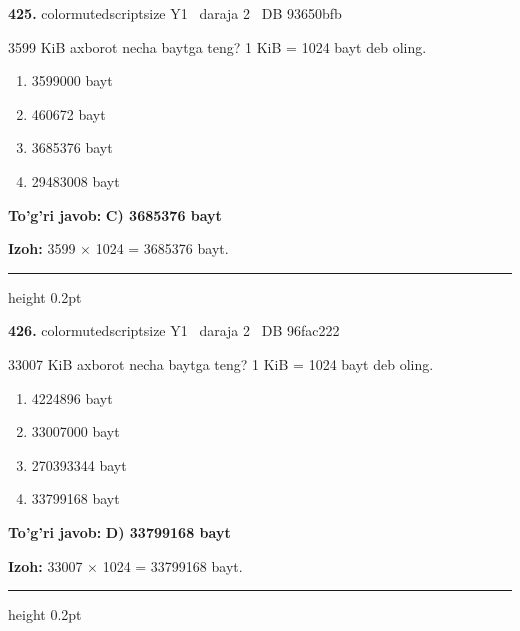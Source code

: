 \documentclass[10pt,a4paper,oneside]{article}
\begin{document}
\noindent\textbf{\color{ink}425.}  {color{muted}scriptsize Y1 \textbullet\ daraja 2 \textbullet\ DB 93650bfb}
\par
3599 KiB axborot necha baytga teng? 1 KiB = 1024 bayt deb oling.
\begin{enumerate}[label=\Alph*),leftmargin=9mm]
\item 3599000 bayt
\item 460672 bayt
\item 3685376 bayt
\item 29483008 bayt
\end{enumerate}
\begin{tcolorbox}[enhanced,breakable,colback=teal!4,colframe=teal!50!black,boxrule=0.5pt,arc=1.1mm,left=3mm,right=3mm,top=1.7mm,bottom=1.7mm,before skip=2mm,after skip=2mm]
\textbf{\color{teal}To'g'ri javob:} \textbf{C) 3685376 bayt}
\par\smallskip
\textbf{Izoh:} 3599 \ensuremath{\times} 1024 = 3685376 bayt.
\end{tcolorbox}
\vspace{2mm}\hrule height 0.2pt \vspace{3mm}

\noindent\textbf{\color{ink}426.}  {color{muted}scriptsize Y1 \textbullet\ daraja 2 \textbullet\ DB 96fac222}
\par
33007 KiB axborot necha baytga teng? 1 KiB = 1024 bayt deb oling.
\begin{enumerate}[label=\Alph*),leftmargin=9mm]
\item 4224896 bayt
\item 33007000 bayt
\item 270393344 bayt
\item 33799168 bayt
\end{enumerate}
\begin{tcolorbox}[enhanced,breakable,colback=teal!4,colframe=teal!50!black,boxrule=0.5pt,arc=1.1mm,left=3mm,right=3mm,top=1.7mm,bottom=1.7mm,before skip=2mm,after skip=2mm]
\textbf{\color{teal}To'g'ri javob:} \textbf{D) 33799168 bayt}
\par\smallskip
\textbf{Izoh:} 33007 \ensuremath{\times} 1024 = 33799168 bayt.
\end{tcolorbox}
\vspace{2mm}\hrule height 0.2pt \vspace{3mm}
\end{document}

